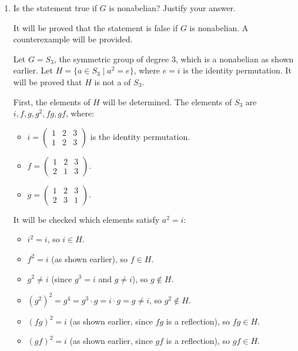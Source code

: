 \begin{enumerate}
\begin{enumerate}
\begin{subprove}
\begin{itemize}
        Therefore, \(a * b \in H\).
        \item For any \(a \in H\), since \(a^{2} = e\), it follows that \(a = a^{-1}\).
        Therefore, \((a^{-1})^{2} = a^{2} = e\), so \(a^{-1} \in H\).
      \end{itemize}
      Therefore, \(H\) is a  of \(G\).
    \end{subprove}
    \item Is the statement true if \(G\) is nonabelian? Justify your answer.
    \begin{subprove}
      It will be proved that the statement is false if \(G\) is nonabelian.
      A counterexample will be provided.
      
      Let \(G = S_{3}\), the symmetric group of degree \(3\), which is a nonabelian  as shown earlier.
      Let \(H = \{a \in S_{3} \mid a^{2} = e\}\), where \(e = i\) is the identity permutation.
      It will be proved that \(H\) is not a  of \(S_{3}\).
      
      First, the elements of \(H\) will be determined.
      The elements of \(S_{3}\) are \(i, f, g, g^{2}, f g, g f\), where:
      \begin{itemize}
        \item \(i = \begin{pmatrix} 1 & 2 & 3 \\ 1 & 2 & 3 \end{pmatrix}\) is the identity permutation.
        \item \(f = \begin{pmatrix} 1 & 2 & 3 \\ 2 & 1 & 3 \end{pmatrix}\).
        \item \(g = \begin{pmatrix} 1 & 2 & 3 \\ 2 & 3 & 1 \end{pmatrix}\).
      \end{itemize}
      
      It will be checked which elements satisfy \(a^{2} = i\):
      \begin{itemize}
        \item \(i^{2} = i\), so \(i \in H\).
        \item \(f^{2} = i\) (as shown earlier), so \(f \in H\).
        \item \(g^{2} \neq i\) (since \(g^{3} = i\) and \(g \neq i\)), so \(g \notin H\).
        \item \((g^{2})^{2} = g^{4} = g^{3} \cdot g = i \cdot g = g \neq i\), so \(g^{2} \notin H\).
        \item \((f g)^{2} = i\) (as shown earlier, since \(f g\) is a reflection), so \(f g \in H\).
        \item \((g f)^{2} = i\) (as shown earlier, since \(g f\) is a reflection), so \(g f \in H\).
      \end{itemize}
      

\end{subprove}
\end{enumerate}
\end{enumerate}

